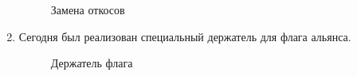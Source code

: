 \begin{enumerate}
\begin{figure}[H]
\begin{minipage}[h]{0.47\linewidth}
	    	\caption{Замена откосов}
	    \end{minipage}
	\end{figure}
	
	\item Сегодня был реализован специальный держатель для флага альянса.
	\begin{figure}[H]
		\begin{minipage}[h]{0.47\linewidth}
		\end{minipage}
		\hfill
		\begin{minipage}[h]{0.47\linewidth}
		\end{minipage}
		\caption{Держатель флага}
	\end{figure}
	

\end{enumerate}
